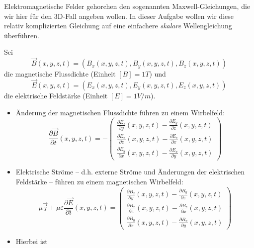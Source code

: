 \documentclass[a4paper,12pt]{article}
\begin{document}
\begin{task}{}
Elektromagnetische Felder gehorchen den sogenannten Maxwell-Gleichungen, die wir hier für den 3D-Fall angeben wollen. In dieser Aufgabe wollen wir diese relativ komplizierten Gleichung auf eine einfachere \emph{skalare} Wellengleichung überführen.

Sei 
$$
\vec{B}(x,y,z, t) = (B_x(x,y,z, t),B_y(x,y,z, t),B_z(x,y,z, t))
$$ 
die magnetische Flussdichte (Einheit $[B] = 1 T$) und 
$$
\vec{E}(x,y,z, t) = (E_x(x,y,z, t),E_y(x,y,z, t),E_z(x,y,z, t))
$$
die elektrische Feldstärke (Einheit $[E] = 1 V / m$).
\begin{itemize}
  \item Änderung der magnetischen Flussdichte führen zu einem Wirbelfeld:
  \begin{equation} \label{eq:maxw1}
\frac{\partial \vec{B}}{\partial t}(x,y,z, t) = - \left( \begin{array}{c}
 \frac{\partial {E}_z}{\partial y}(x,y,z, t) - \frac{\partial {E}_y}{\partial z}(x,y,z, t) \\
 \frac{\partial {E}_x}{\partial z}(x,y,z, t) - \frac{\partial {E}_z}{\partial x}(x,y,z, t) \\
 \frac{\partial {E}_y}{\partial x}(x,y,z, t) - \frac{\partial {E}_x}{\partial y}(x,y,z, t)
\end{array} \right)
\end{equation}
  \item Elektrische Ströme -- d.h. externe Ströme und Änderungen der elektrischen Feldstärke --  führen zu einem magnetischen Wirbelfeld:
  \begin{equation} \label{eq:maxw2}
  \mu \vec{j} + \mu \varepsilon \frac{\partial \vec{E}}{\partial t}(x,y,z, t) = \left( \begin{array}{c}
 \frac{\partial {B}_z}{\partial y}(x,y,z, t) - \frac{\partial {B}_y}{\partial z}(x,y,z, t) \\
 \frac{\partial {B}_x}{\partial z}(x,y,z, t) - \frac{\partial {B}_z}{\partial x}(x,y,z, t) \\
 \frac{\partial {B}_y}{\partial x}(x,y,z, t) - \frac{\partial {B}_x}{\partial y}(x,y,z, t)
\end{array} \right)
\end{equation}
  \item Hierbei ist 

\end{itemize}
\end{task}
\end{document}

